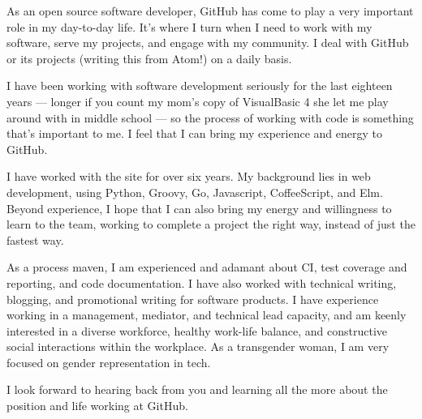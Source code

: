As an open source software developer, GitHub has come to play a very important role in my day-to-day life. It's where I turn when I need to work with my software, serve my projects, and engage with my community. I deal with GitHub or its projects (writing this from Atom!) on a daily basis.

I have been working with software development seriously for the last eighteen years --- longer if you count my mom's copy of VisualBasic 4 she let me play around with in middle school --- so the process of working with code is something that's important to me. I feel that I can bring my experience and energy to GitHub.

I have worked with the site for over six years. My background lies in web development, using Python, Groovy, Go, Javascript, CoffeeScript, and Elm. Beyond experience, I hope that I can also bring my energy and willingness to learn to the team, working to complete a project the right way, instead of just the fastest way.

As a process maven, I am experienced and adamant about CI, test coverage and reporting, and code documentation. I have also worked with technical writing, blogging, and promotional writing for software products. I have experience working in a management, mediator, and technical lead capacity, and am keenly interested in a diverse workforce, healthy work-life balance, and constructive social interactions within the workplace. As a transgender woman, I am very focused on gender representation in tech.

I look forward to hearing back from you and learning all the more about the position and life working at GitHub.
